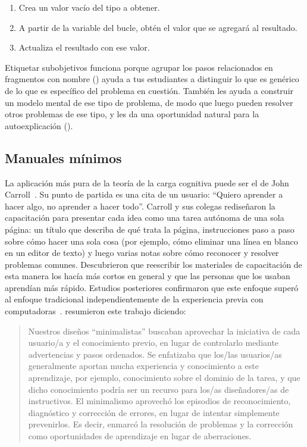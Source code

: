 \begin{enumerate}

\item
  Crea un valor vacío del tipo a obtener.

\item
  A partir de la variable del bucle, obtén el valor que se agregará al resultado.

\item
  Actualiza el resultado con ese valor.

\end{enumerate}

Etiquetar sub\-objetivos funciona porque agrupar los pasos relacionados 
en fragmentos con nombre ()
ayuda a tus estudiantes a distinguir lo que es genérico de lo que es específico del problema en cuestión.
También les ayuda a construir un modelo mental de ese tipo de problema,
de modo que luego pueden resolver otros problemas de ese tipo,
y les da una oportunidad natural para la auto\-explicación ().

\subsection*{Manuales mínimos}

La aplicación más pura de la teoría de la carga cognitiva puede ser el  de
John Carroll~\cite{Carr1987,Carr2014}.
Su punto de partida es una cita de un usuario: ``Quiero aprender a hacer algo, no aprender a hacer todo''.
Carroll y sus colegas rediseñaron la capacitación para presentar cada idea como una tarea autónoma de una sola página:
un título que describa de qué trata la página,
instrucciones paso a paso sobre cómo hacer una sola cosa
(por ejemplo, cómo eliminar una línea en blanco en un editor de texto)
y luego varias notas sobre cómo reconocer y resolver problemas comunes.
Descubrieron que reescribir los materiales de capacitación de esta manera los hacía más cortos en general
y que las personas que los usaban aprendían más rápido.
Estudios posteriores confirmaron que este enfoque superó al enfoque tradicional
independientemente de la experiencia previa con computadoras~\cite{Lazo1993}.
\cite{Carr2014} resumieron este trabajo diciendo:

\begin{quote}

  Nuestros diseños ``minimalistas'' buscaban aprovechar la iniciativa de cada usuario/a y el conocimiento previo,
  en lugar de controlarlo mediante advertencias y pasos ordenados.
  Se enfatizaba que los/las usuarios/as generalmente aportan mucha experiencia y conocimiento a este aprendizaje,
  por ejemplo,
  conocimiento sobre el dominio de la tarea,
  y que dicho conocimiento podría ser un recurso para los/as diseñadores/as de instructivos.
  El minimalismo aprovechó los episodios de reconocimiento, diagnóstico y corrección de errores,
  en lugar de intentar simplemente prevenirlos. Es decir,
  enmarcó la resolución de problemas y la corrección como oportunidades de aprendizaje en lugar de aberraciones.

\end{quote}


